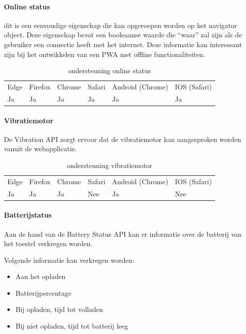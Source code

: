 \paragraph{Online status}

dit is een eenvoudige eigenschap die kan opgeroepen worden op het navigator object. Deze eigenschap bevat een booleaanse waarde die “waar” zal zijn als de gebruiker een connectie heeft met het internet. Deze informatie kan interessant zijn bij het ontwikkelen van een PWA met offline functionaliteiten.
\begin{table}[H]
	\centering
	\begin{tabular}{llllll}
		Edge & Firefox & Chrome & Safari & Android (Chrome) & IOS (Safari) \\
		Ja   & Ja      &  Ja     & Ja     & Ja               & Ja          
	\end{tabular}	
	\caption{ondersteuning online status }
	\label{ondersteuning online status}
\end{table}

\paragraph{Vibratiemotor }

De Vibration API \autocite{Kostionen2020} zorgt ervoor dat de vibratiemotor kan aangesproken worden vanuit de webapplicatie.

\begin{table}[H]
	\begin{tabular}{llllll}
		Edge & Firefox & Chrome & Safari & Android (Chrome) & IOS (Safari) \\
		Ja   & Ja      &  Ja     & Nee     & Ja               & Nee          
	\end{tabular}	
	\caption{ondersteuning vibratiemotor  }
	\label{ondersteuning vibratiemotor  }
\end{table}


\paragraph{Batterijstatus}

Aan de hand van de Battery Status API \autocite{Kostiainen2020} kan er informatie over de batterij van het toestel verkregen worden.

Volgende informatie kan verkregen worden:
 \begin{itemize}
	\item	Aan het opladen
	\item	Batterijpercentage
	\item	Bij opladen, tijd tot volladen
	\item	Bij niet opladen, tijd tot batterij leeg
\end{itemize}

